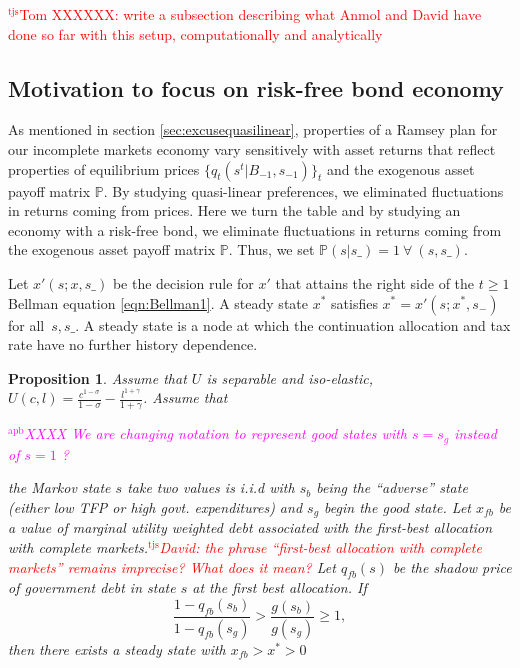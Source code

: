 \documentclass[12pt]{article}
\newcommand{\apb}[1]{\textcolor{magenta}{$^{\textrm{apb}}${#1}}}
\newcommand{\tjs}[1]{\textcolor{red}{$^{\textrm{tjs}}${#1}}}
\newtheorem{proposition}[theorem]{Proposition}
\begin{document}
\tjs{Tom XXXXXX: write a subsection describing what Anmol and David have done so far with this setup, computationally
and analytically}

\subsection{Motivation to focus on risk-free bond economy\label{sec:riskfreeonly}}

As mentioned in section \ref{sec:excusequasilinear},  properties of a Ramsey plan for our incomplete markets economy vary sensitively  with   asset returns that reflect
	properties of equilibrium prices $\{q_t(s^t|B_{-1},s_{-1})\}_t$ and the exogenous asset payoff matrix $\mathbb{P}$.  By studying
quasi-linear preferences, we eliminated fluctuations in returns coming from prices.  Here we turn the table and by studying an economy
with a risk-free bond, we eliminate fluctuations in returns coming from the exogenous asset payoff matrix $\mathbb{P}$.
Thus, we set $\mathbb{P}(s|s\_)=1 \ \forall \ (s,s\_)$.



Let $x'\left( s;{x},s\_\right) $ be the decision rule for $x'$ that attains the right side of the $t\geq1$ Bellman equation
\eqref{eqn:Bellman1}.  A steady state  ${x}^{*} $  satisfies ${ x}^{*}  =x' \left( s;{x}^{*},s_{-}\right) $ for all $%
\,s,s\_$.
A steady state is a node at which the  continuation allocation and tax rate have no further history dependence.

\begin{proposition}\label{prop:existenceU}
Assume that $U$ is  separable and iso-elastic,	 $U(c,l) = \frac{c^{1-\sigma}}{1-\sigma} -\frac{ l^{1+\gamma}}{1+\gamma}$.
Assume that

\apb{XXXX We are changing notation to represent good states with $s=s_g$ instead of $s=1$ ?}

	 the Markov state $s$ take two values is  i.i.d with $s_b$  being the ``adverse'' state (either low TFP or high govt. expenditures)
and $s_g$ begin the good state.
		Let $x_{fb}$ be a value of  %
marginal utility weighted debt associated with the first-best allocation with complete markets.\tjs{David: the phrase
``first-best allocation with complete markets'' remains imprecise?  What does it mean?}
	 Let $q_{fb}(s)$ be the shadow price of government debt in state $s$ at the first best allocation.
	If
	\begin{equation}\label{eqn:prop52sufficient}
		\frac{1-q_{fb}(s_b)}{1-q_{fb}(s_g)} > \frac{g(s_b)}{g(s_g)}\geq 1 ,
	\end{equation}
		then there exists a steady state with $x_{fb}>x^*>0$
		\end{proposition}
\end{document}
